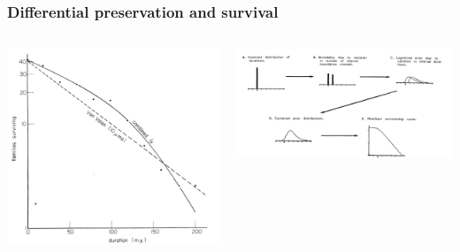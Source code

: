 \documentclass{beamer}
\begin{document}
\begin{frame}
  \frametitle{Differential preservation and survival}

  \begin{columns}
    \begin{column}{0.5\textwidth}
      \begin{center}
        \includegraphics[height = 0.4\textheight, width = \textwidth, keepaspectratio = true]{figure/raup}

        \tiny{}

      \end{center}
    \end{column}
    \begin{column}{0.5\textwidth}
      \includegraphics[height = 0.4\textheight, width = \textwidth, keepaspectratio = true]{figure/sepkoski}

      \tiny{}

    \end{column}
  \end{columns}
\end{frame}
\end{document}
